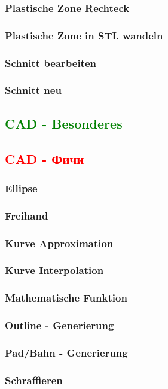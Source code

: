 \documentclass[14pt,a4paper]{book}
\newcommand{\DE}[1]{\textcolor{green}{#1}}
\newcommand{\RU}[1]{\textcolor{red}{#1}}
\begin{document}
			\subsubsection{Plastische Zone Rechteck}
			\subsubsection{Plastische Zone in STL wandeln}
			\subsubsection{Schnitt bearbeiten}
			\subsubsection{Schnitt neu}
		\DE{\subsection{CAD - Besonderes}}
		\RU{\subsection{CAD - Фичи}}
			\subsubsection{Ellipse}
			\subsubsection{Freihand}
			\subsubsection{Kurve Approximation}
			\subsubsection{Kurve Interpolation}
			\subsubsection{Mathematische Funktion}
			\subsubsection{Outline - Generierung}
			\subsubsection{Pad/Bahn - Generierung}
			\subsubsection{Schraffieren}
\end{document}

